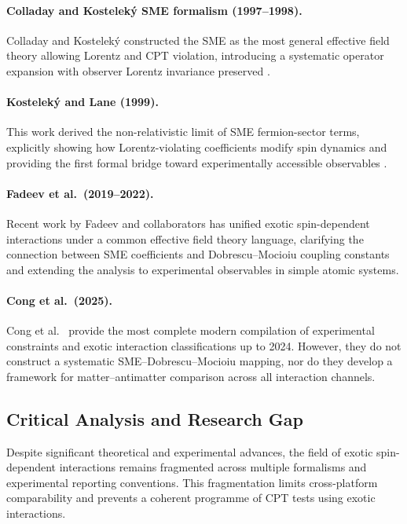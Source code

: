 \documentclass[12pt,a4paper]{report}
\begin{document}
\paragraph{Colladay and Kostelek\'{y} SME formalism (1997--1998).}
Colladay and Kostelek\'{y} constructed the SME as the most general effective
field theory allowing Lorentz and CPT violation, introducing a systematic
operator expansion with observer Lorentz invariance preserved
\cite{Colladay1997,Colladay1998}.

\paragraph{Kostelek\'{y} and Lane (1999).}
This work derived the non-relativistic limit of SME fermion-sector terms,
explicitly showing how Lorentz-violating coefficients modify spin dynamics and
providing the first formal bridge toward experimentally accessible observables
\cite{KosteleckyLane1999}.

\paragraph{Fadeev et al.\ (2019--2022).}
Recent work by Fadeev and collaborators \cite{Fadeev2019,Fadeev2022} has
unified exotic spin-dependent interactions under a common effective field theory
language, clarifying the connection between SME coefficients and
Dobrescu--Mocioiu coupling constants and extending the analysis to experimental
observables in simple atomic systems.

\paragraph{Cong et al.\ (2025).}
Cong et al.\ \cite{Cong2025} provide the most complete modern compilation of
experimental constraints and exotic interaction classifications up to 2024.
However, they do not construct a systematic SME--Dobrescu--Mocioiu mapping, nor
do they develop a framework for matter--antimatter comparison across all
interaction channels.

\subsection{Critical Analysis and Research Gap}

Despite significant theoretical and experimental advances, the field of exotic
spin-dependent interactions remains fragmented across multiple formalisms and
experimental reporting conventions. This fragmentation limits cross-platform
comparability and prevents a coherent programme of CPT tests using exotic
interactions.
\end{document}
